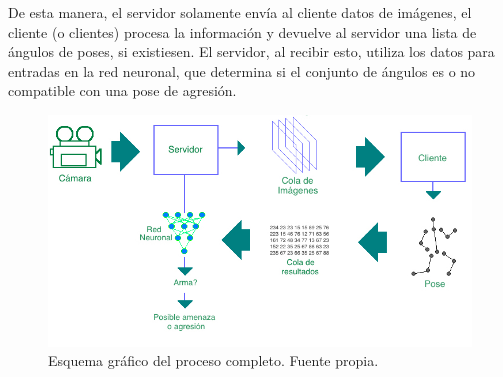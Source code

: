 \documentclass[a4paper,12pt,oneside,spanish]{book}
\begin{document}
De esta manera, el servidor solamente envía al cliente datos de imágenes, el cliente (o clientes) procesa la información y devuelve al servidor una lista de ángulos de poses, si existiesen. El servidor, al recibir esto, utiliza los datos para entradas en la red neuronal, que determina si el conjunto de ángulos es o no compatible con una pose de agresión.\par

\vspace*{0.7cm}

\begin{figure}[h!]
	\includegraphics[width=460pt]{Imagenes/process1.jpg}
	\centering	
	\caption{Esquema gráfico del proceso completo. Fuente propia.}
	\label{fig:code1}
\end{figure}
\end{document}
